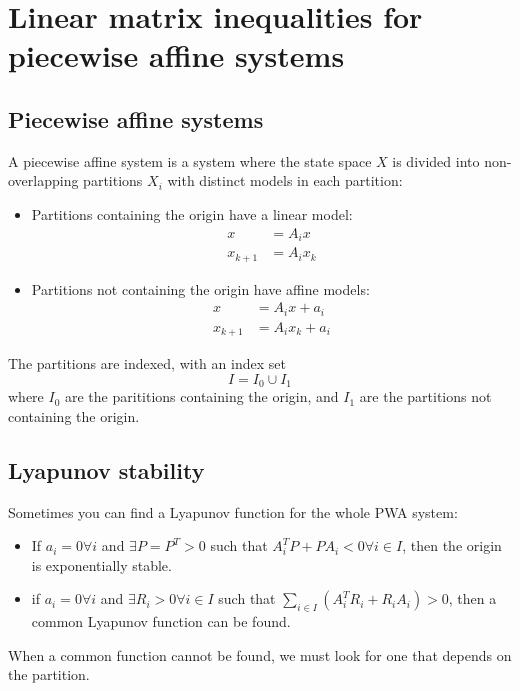\section{Linear matrix inequalities for piecewise affine systems}

\subsection{Piecewise affine systems}
A piecewise affine system is a system where the state space $X$ is divided into non-overlapping partitions $X_i$ with distinct models in each partition:
\begin{itemize}
    \item Partitions containing the origin have a linear model:
    \begin{equation}
    \begin{split}
        x &= A_i x \\
        x_{k+1} &= A_i x_k
    \end{split}
    \end{equation}
    \item Partitions not containing the origin have affine models:
    \begin{equation}
    \begin{split}
        x &= A_i x + a_i \\
        x_{k+1} &= A_i x_k + a_i
    \end{split}
    \end{equation}
\end{itemize}

The partitions are indexed, with an index set
\begin{equation}
    I = I_0 \cup I_1
\end{equation}
where $I_0$ are the parititions containing the origin, and $I_1$ are the partitions not containing the origin.

\subsection{Lyapunov stability}
Sometimes you can find a Lyapunov function for the whole PWA system:
\begin{itemize}
    \item If $a_i = 0 \forall i$ and $\exists P = P^T > 0$ such that $A_i^T P + P A_i < 0 \forall i \in I$, then the origin is exponentially stable.
    \item if  $a_i = 0 \forall i$ and $\exists R_i > 0 \forall i \in I$ such that $\sum_{i \in I} (A_i^T R_i + R_i A_i) > 0$, then a common Lyapunov function can be found.
\end{itemize}
When a common function cannot be found, we must look for one that depends on the partition.

